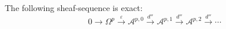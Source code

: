 The following sheaf-sequence is exact:
$$
0 \rightarrow \Omega^p \xrightarrow{\varepsilon} \mathcal{A}^{p,0} \xrightarrow{d''} \mathcal{A}^{p,1} \xrightarrow{d''} \mathcal{A}^{p,2} \xrightarrow{d''} \cdots
$$
